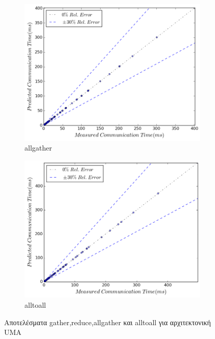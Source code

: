 \begin{figure}[H]
    \begin{subfigure}[b]{0.4\textwidth}
        \includegraphics[width=\textwidth]{./images/all_NUMA/allgather.png}
        \caption{allgather}
    \end{subfigure}
    \quad 
    \begin{subfigure}[b]{0.4\textwidth}
        \includegraphics[width=\textwidth]{./images/all_NUMA/alltoall.png}
        \caption{alltoall}
    \end{subfigure}


    \caption{Αποτελέσματα gather,reduce,allgather και alltoall για αρχιτεκτονική UMA}
\end{figure}

